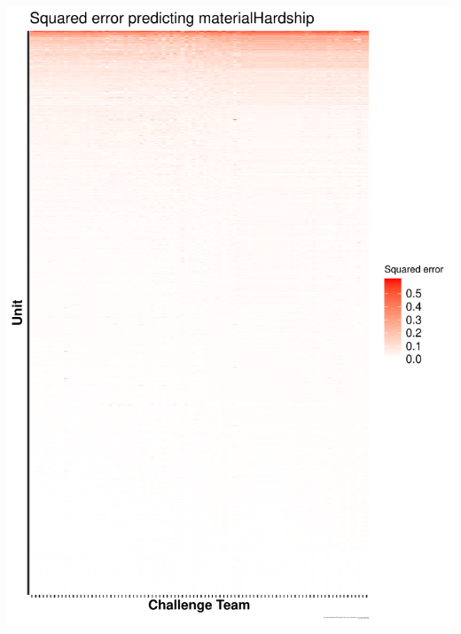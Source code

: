 \documentclass{beamer}
\begin{document}
\begin{frame}

\begin{center}
\includegraphics[height=0.90\textheight]{figures/materialHardship_ysort_mse_unit_outcome_xsort_mse_account_outcome.pdf}
\end{center}

\end{frame}
\end{document}
